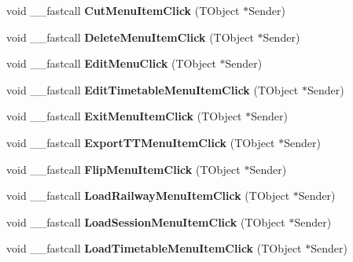 \begin{DoxyCompactItemize}
void \+\_\+\+\_\+fastcall {\bfseries Cut\+Menu\+Item\+Click} (T\+Object $\ast$Sender)
\item 
\mbox{\label{class_t_interface_aff2c1cd6ed2d45fdcf6392a85a6d9415}} 
void \+\_\+\+\_\+fastcall {\bfseries Delete\+Menu\+Item\+Click} (T\+Object $\ast$Sender)
\item 
\mbox{\label{class_t_interface_ac53c02024590fc44371ed3b7efc3ddde}} 
void \+\_\+\+\_\+fastcall {\bfseries Edit\+Menu\+Click} (T\+Object $\ast$Sender)
\item 
\mbox{\label{class_t_interface_a0cf35a6e4a6cfa72b63222acb51f9f74}} 
void \+\_\+\+\_\+fastcall {\bfseries Edit\+Timetable\+Menu\+Item\+Click} (T\+Object $\ast$Sender)
\item 
\mbox{\label{class_t_interface_a9cfdb7521877f2c7ab124d0e4f47a0f6}} 
void \+\_\+\+\_\+fastcall {\bfseries Exit\+Menu\+Item\+Click} (T\+Object $\ast$Sender)
\item 
\mbox{\label{class_t_interface_a1bf4807428bf9fa4504be97d28642597}} 
void \+\_\+\+\_\+fastcall {\bfseries Export\+T\+T\+Menu\+Item\+Click} (T\+Object $\ast$Sender)
\item 
\mbox{\label{class_t_interface_add5fbdbceae6285c2cc440905b270491}} 
void \+\_\+\+\_\+fastcall {\bfseries Flip\+Menu\+Item\+Click} (T\+Object $\ast$Sender)
\item 
\mbox{\label{class_t_interface_a96249c7622a9d55541de186483e04d2e}} 
void \+\_\+\+\_\+fastcall {\bfseries Load\+Railway\+Menu\+Item\+Click} (T\+Object $\ast$Sender)
\item 
\mbox{\label{class_t_interface_a5ade3b7719ed90dace590aa342fc0774}} 
void \+\_\+\+\_\+fastcall {\bfseries Load\+Session\+Menu\+Item\+Click} (T\+Object $\ast$Sender)
\item 
\mbox{\label{class_t_interface_a15a2f5ad77e4f6c2b0cc6314224dfb78}} 
void \+\_\+\+\_\+fastcall {\bfseries Load\+Timetable\+Menu\+Item\+Click} (T\+Object $\ast$Sender)
\item 
\mbox{\label{class_t_interface_a4ee6afffbc33eab918cba315ab65ee6e}} 

\end{DoxyCompactItemize}
